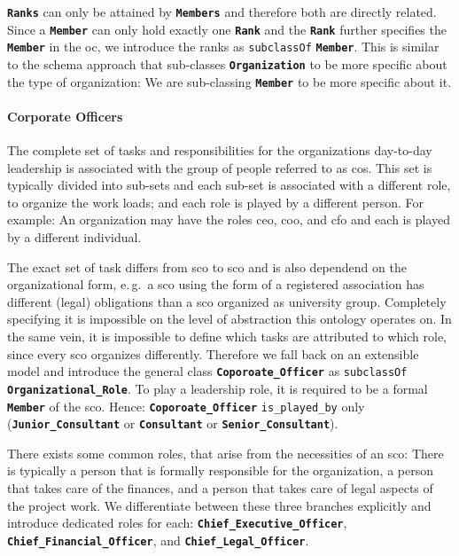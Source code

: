 \documentclass[a4paper, DIV=13, BCOR=0cm]{scrbook}
\newcommand{\eg}{e.\,g.\ }
\newcommand{\class}[1]{\texttt{\textbf{#1}}}
\newcommand{\relation}[1]{\texttt{#1}}
\begin{document}
\class{Ranks} can only be attained by \class{Members} and therefore both are directly related. Since a \class{Member} can only hold exactly one \class{Rank} and the \class{Rank} further specifies the \class{Member} in the \gls{oc}, we introduce the ranks as \relation{subclassOf} \class{Member}. This is similar to the \gls{schema} approach that sub-classes \class{Organization} to be more specific about the type of organization: We are sub-classing \class{Member} to be more specific about it.

\paragraph{Corporate Officers}
The complete set of tasks and responsibilities for the organizations day-to-day leadership is associated with the group of people referred to as \glspl{co}. This set is typically divided into sub-sets and each sub-set is associated with a different role, to organize the work loads; and each role is played by a different person. For example: An organization may have the roles \gls{ceo}, \gls{coo}, and \gls{cfo} and each is played by a different individual.

The exact set of task differs from \gls{sco} to \gls{sco} and is also dependend on the organizational form, \eg a \gls{sco} using the form of a registered association has different (legal) obligations than a \gls{sco} organized as university group. Completely specifying it is impossible on the level of abstraction this ontology operates on. In the same vein, it is impossible to define which tasks are attributed to which role, since every \gls{sco} organizes differently. Therefore we fall back on an extensible model and introduce the general class \class{Coporoate\_Officer} as \relation{subclassOf} \class{Organizational\_Role}. To play a leadership role, it is required to be a formal \class{Member} of the \gls{sco}. Hence: \class{Coporoate\_Officer} \relation{is\_played\_by} only 
(\class{Junior\_Consultant} or \class{Consultant} or \class{Senior\_Consultant}).

There exists some common roles, that arise from the necessities of an \gls{sco}: There is typically a person that is formally responsible for the organization, a person that takes care of the finances, and a person that takes care of legal aspects of the project work. We differentiate between these three branches explicitly and introduce dedicated roles for each: \class{Chief\_Executive\_Officer}, \class{Chief\_Financial\_Officer}, and \class{Chief\_Legal\_Officer}.
\end{document}
